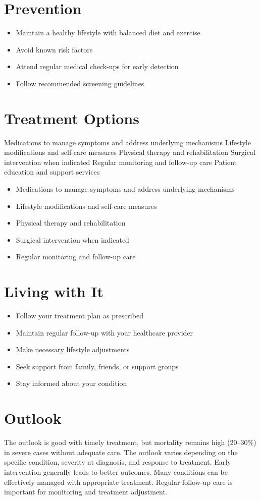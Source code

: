 \section{Prevention}
\begin{itemize}[noitemsep]
  \item Maintain a healthy lifestyle with balanced diet and exercise
  \item Avoid known risk factors
  \item Attend regular medical check-ups for early detection
  \item Follow recommended screening guidelines
\end{itemize}
\section{Treatment Options}
Medications to manage symptoms and address underlying mechanisms Lifestyle modifications and self-care measures Physical therapy and rehabilitation Surgical intervention when indicated Regular monitoring and follow-up care Patient education and support services

\begin{itemize}[noitemsep]
  \item Medications to manage symptoms and address underlying mechanisms
  \item Lifestyle modifications and self-care measures
  \item Physical therapy and rehabilitation
  \item Surgical intervention when indicated
  \item Regular monitoring and follow-up care
\end{itemize}
\section{Living with It}
\begin{itemize}[noitemsep]
  \item Follow your treatment plan as prescribed
  \item Maintain regular follow-up with your healthcare provider
  \item Make necessary lifestyle adjustments
  \item Seek support from family, friends, or support groups
  \item Stay informed about your condition
\end{itemize}
\section{Outlook}
The outlook is good with timely treatment, but mortality remains high (20--30\%) in severe cases without adequate care. The outlook varies depending on the specific condition, severity at diagnosis, and response to treatment. Early intervention generally leads to better outcomes. Many conditions can be effectively managed with appropriate treatment. Regular follow-up care is important for monitoring and treatment adjustment.
